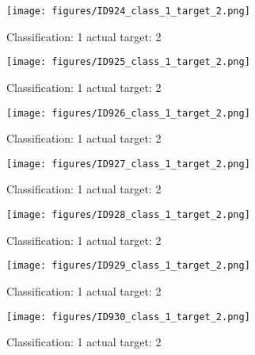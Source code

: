 \begin{figure}[h!]
\begin{center}
\texttt{[image: figures/ID924\_class\_1\_target\_2.png]}
\end{center}
\caption{ Classification: 1 actual target: 2}
\label{fig:ID924_class_1_target_2}
\end{figure}
\begin{figure}[h!]
\begin{center}
\texttt{[image: figures/ID925\_class\_1\_target\_2.png]}
\end{center}
\caption{ Classification: 1 actual target: 2}
\label{fig:ID925_class_1_target_2}
\end{figure}
\begin{figure}[h!]
\begin{center}
\texttt{[image: figures/ID926\_class\_1\_target\_2.png]}
\end{center}
\caption{ Classification: 1 actual target: 2}
\label{fig:ID926_class_1_target_2}
\end{figure}
\begin{figure}[h!]
\begin{center}
\texttt{[image: figures/ID927\_class\_1\_target\_2.png]}
\end{center}
\caption{ Classification: 1 actual target: 2}
\label{fig:ID927_class_1_target_2}
\end{figure}
\begin{figure}[h!]
\begin{center}
\texttt{[image: figures/ID928\_class\_1\_target\_2.png]}
\end{center}
\caption{ Classification: 1 actual target: 2}
\label{fig:ID928_class_1_target_2}
\end{figure}
\begin{figure}[h!]
\begin{center}
\texttt{[image: figures/ID929\_class\_1\_target\_2.png]}
\end{center}
\caption{ Classification: 1 actual target: 2}
\label{fig:ID929_class_1_target_2}
\end{figure}
\begin{figure}[h!]
\begin{center}
\texttt{[image: figures/ID930\_class\_1\_target\_2.png]}
\end{center}
\caption{ Classification: 1 actual target: 2}
\label{fig:ID930_class_1_target_2}
\end{figure}
